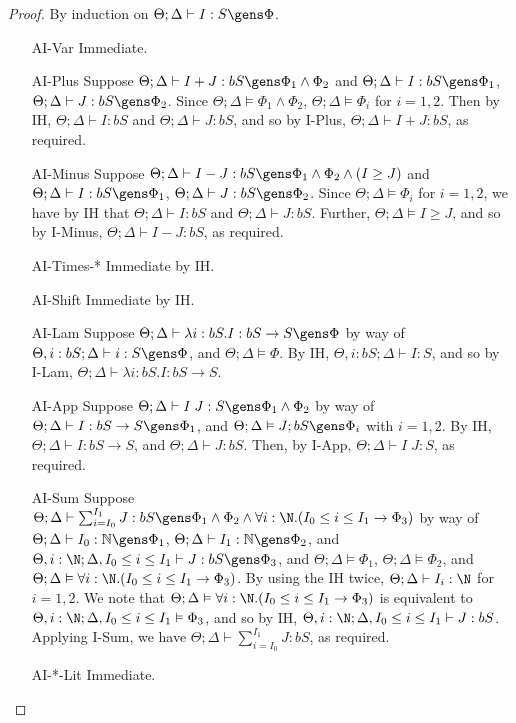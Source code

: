 \begin{proof}
By induction on $\Theta;\Delta \vdash I : S \gens \Phi$.
\begin{enumerate}
  \item[AI-Var] Immediate.
  \item[AI-Plus] Suppose $\Theta ;\Delta \vdash I + J : bS \gens \Phi_1 \wedge \Phi_2$ and $\Theta ; \Delta \vdash I : bS \gens \Phi_1$, $\Theta ; \Delta \vdash J : bS \gens \Phi_2$. Since $\Theta ; \Delta \vDash \Phi_1 \wedge \Phi_2$, $\Theta ; \Delta \vDash \Phi_i$ for $i=1,2$. Then by IH, $\Theta ; \Delta \vdash I : bS$ and $\Theta ; \Delta \vdash J : bS$, and so by I-Plus, $\Theta ; \Delta \vdash I + J : bS$, as required.
  \item[AI-Minus] Suppose $\Theta ;\Delta \vdash I - J : bS \gens \Phi_1 \wedge \Phi_2 \wedge (I \geq J)$ and $\Theta ; \Delta \vdash I : bS \gens \Phi_1$, $\Theta ; \Delta \vdash J : bS \gens \Phi_2$. Since $\Theta ; \Delta \vDash \Phi_i$ for $i=1,2$, we have by IH that $\Theta ; \Delta \vdash I : bS$ and $\Theta ; \Delta \vdash J : bS$. Further, $\Theta ; \Delta \vDash I \geq J$, and so by I-Minus, $\Theta ;\Delta \vdash I - J : bS$, as required.
  \item[AI-Times-*] Immediate by IH.
  \item[AI-Shift] Immediate by IH.
  \item[AI-Lam] Suppose $\Theta ; \Delta \vdash \lambda i : bS. I : bS \to S \gens \Phi$ by way of $\Theta , i : bS ; \Delta \vdash i : S \gens \Phi$, and $\Theta ; \Delta \vDash \Phi$. By IH, $\Theta, i : bS ; \Delta \vdash I : S$, and so by I-Lam, $\Theta ; \Delta \vdash \lambda i : bS. I : bS \to S$.
  \item[AI-App] Suppose $\Theta ;\Delta \vdash I\; J : S \gens \Phi_1 \wedge \Phi_2$ by way of $\Theta ; \Delta \vdash I : bS \to S \gens \Phi_1$, and $\Theta ; \Delta \vDash J ; bS \gens \Phi_i$ with $i=1,2$. By IH, $\Theta ; \Delta \vdash I : bS \to S$, and $\Theta ; \Delta \vdash J : bS$. Then, by I-App, $\Theta ; \Delta \vdash I \; J : S$, as required.
  \item[AI-Sum] Suppose $\Theta;\Delta \vdash \sum_{i=I_0}^{I_1} J : bS \gens \Phi_1 \wedge \Phi_2 \wedge \forall i : \N.(I_0 \leq i \leq I_1 \to \Phi_3)$ by way of $\Theta;\Delta \vdash I_0 : \mathbb{N} \gens \Phi_1$, $\Theta;\Delta \vdash I_1 : \mathbb{N} \gens \Phi_2$, and $\Theta,i : \N;\Delta, I_0 \leq i \leq I_1 \vdash J : bS \gens \Phi_3$, and 
  $\Theta ; \Delta \vDash \Phi_1$,
  $\Theta ; \Delta \vDash \Phi_2$, and 
  $\Theta ; \Delta \vDash \forall i : \N.(I_0 \leq i \leq I_1 \to \Phi_3)$. By using the IH twice, $\Theta ; \Delta \vdash I_i : \N$ for $i=1,2$. We note that   $\Theta ; \Delta \vDash \forall i : \N.(I_0 \leq i \leq I_1 \to \Phi_3)$ is equivalent to $\Theta, i : \N ; \Delta, I_0 \leq i \leq I_1 \vDash \Phi_3$, and so by IH, $\Theta,i : \N;\Delta, I_0 \leq i \leq I_1 \vdash J : bS$. Applying I-Sum, we have $\Theta;\Delta \vdash \sum_{i=I_0}^{I_1} J : bS$, as required.
  \item[AI-*-Lit] Immediate.
\end{enumerate}
\end{proof}